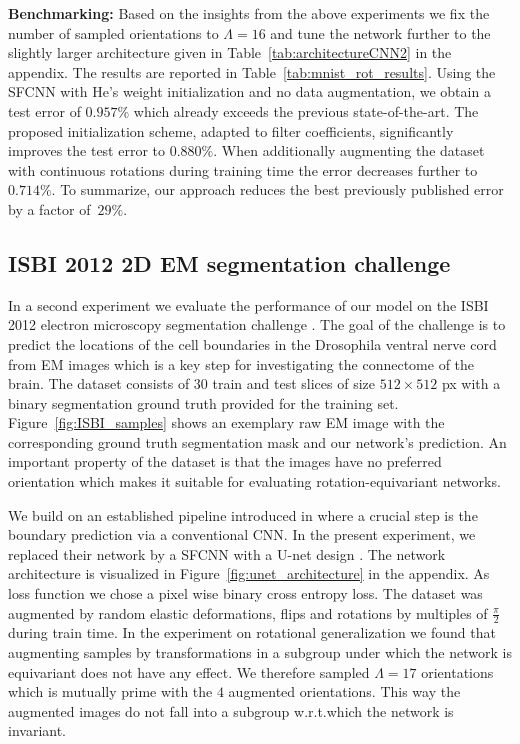 \documentclass[10pt,twocolumn,letterpaper]{article}
\newcommand{\myparagraph}[1]{\vspace*{1ex}\noindent\textbf{#1}}
\begin{document}
\myparagraph{Benchmarking:}
Based on the insights from the above experiments we fix the number of sampled orientations to $\Lambda=16$ and tune the network further to the slightly larger architecture given in Table~\ref{tab:architectureCNN2} in the appendix.
The results are reported in Table~\ref{tab:mnist_rot_results}.
Using the \mbox{SFCNN} with He's weight initialization and no data augmentation, we obtain a test error of $0.957 \%$ which already exceeds the previous state-of-the-art.
The proposed initialization scheme, adapted to filter coefficients, significantly improves the test error to $0.880\%.$
When additionally augmenting the dataset with continuous rotations during training time the error decreases further to $0.714\%.$
To summarize, our approach reduces the best previously published error by a factor of~$29\%.$


\vspace*{-.25ex}
\subsection{ISBI 2012 2D EM segmentation challenge}
\vspace*{-.5ex}

In a second experiment we evaluate the performance of our model on the ISBI 2012 electron microscopy segmentation challenge \cite{arganda2015crowdsourcing}.
The goal of the challenge is to predict the locations of the cell boundaries in the Drosophila ventral nerve cord from EM images which is a key step for investigating the connectome of the brain.
The dataset consists of $30$ train and test slices of size $512\times512$ px with a binary segmentation ground truth provided for the training set.
Figure~\ref{fig:ISBI_samples} shows an exemplary raw EM image with the corresponding ground truth segmentation mask and our network's prediction.
An important property of the dataset is that the images have no preferred orientation which makes it suitable for evaluating rotation-equivariant networks.

We build on an established pipeline introduced in \cite{beier2017multicut} where a crucial step is the boundary prediction via a conventional CNN.
In the present experiment, we replaced their network by a \mbox{SFCNN} with a U-net design \cite{ronneberger2015u}.
The network architecture is visualized in Figure~\ref{fig:unet_architecture} in the appendix.
As loss function we chose a pixel wise binary cross entropy loss.
The dataset was augmented by random elastic deformations, flips and rotations by multiples of $\frac{\pi}{2}$ during train time.
In the experiment on rotational generalization we found that augmenting samples by transformations in a subgroup under which the network is equivariant does not have any effect.
We therefore sampled $\Lambda=17$ orientations which is mutually prime with the $4$ augmented orientations.
This way the augmented images do not fall into a subgroup w.r.t.\@ which the network is invariant.
\end{document}
